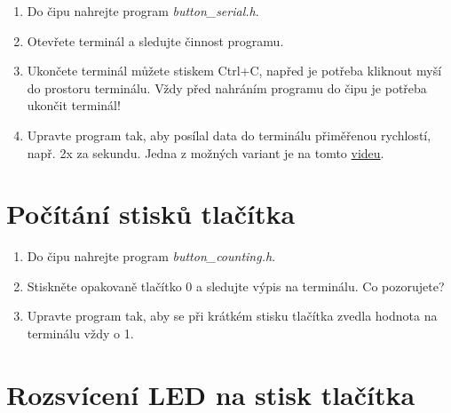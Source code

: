 \documentclass[12pt]{article}
\begin{document}
\begin{enumerate} 
	\item Do čipu nahrejte program \textit{button\_serial.h}.
	\item Otevřete terminál a sledujte činnost programu.  
	\item Ukončete terminál můžete stiskem Ctrl+C, napřed je potřeba kliknout myší do prostoru terminálu. 
	Vždy před nahráním programu do čipu je potřeba ukončit terminál!
	\item Upravte program tak, aby posílal data do terminálu přiměřenou rychlostí, např. 2x za sekundu. Jedna z možných variant je na tomto \href{https://www.youtube.com/watch?v=cfciuCwKXuI&list=PLUcO3yZImuGwjBzWMluj8Pgu0FHjgFYBd&index=5&t=0s}{videu}.
\end{enumerate} 

\section{Počítání stisků tlačítka} \label{counting_LED}

\begin{enumerate} 
	\item Do čipu nahrejte program \textit{button\_counting.h}. 
	\item Stiskněte opakovaně tlačítko 0 a sledujte výpis na terminálu. Co pozorujete? 
	\item Upravte program tak, aby se při krátkém stisku tlačítka zvedla hodnota na terminálu vždy o 1. \label{counting_LED3}
\end{enumerate} 

\section{Rozsvícení LED na stisk tlačítka} \label{button_LED}
\end{document}
